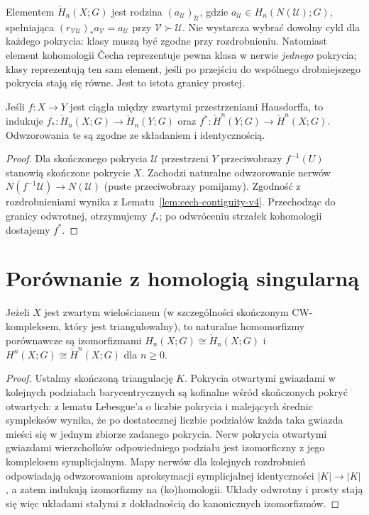 \begin{uwaga}
Elementem $\check H_n(X;G)$ jest rodzina
$(a_{\mathcal U})_{\mathcal U}$, gdzie
$a_{\mathcal U}\in H_n(N(\mathcal U);G)$, spełniająca
$(r_{\mathcal V\mathcal U})_*a_{\mathcal V}=a_{\mathcal U}$
przy $\mathcal V\succ\mathcal U$.
Nie wystarcza wybrać dowolny cykl dla każdego pokrycia:
klasy muszą być zgodne przy rozdrobnieniu.
Natomiast element kohomologii \v{C}echa reprezentuje pewna
klasa w nerwie \emph{jednego} pokrycia; klasy reprezentują
ten sam element, jeśli po przejściu do wspólnego drobniejszego
pokrycia stają się równe. Jest to istota granicy prostej.
\end{uwaga}

\begin{stwierdzenie}[Funktorialność]
Jeśli $f:X\to Y$ jest ciągła między zwartymi przestrzeniami
Hausdorffa, to indukuje
$f_*:\check H_n(X;G)\to\check H_n(Y;G)$
oraz $f^*:\check H^n(Y;G)\to\check H^n(X;G)$.
Odwzorowania te są zgodne ze składaniem i identycznością.
\end{stwierdzenie}
\begin{proof}
Dla skończonego pokrycia $\mathcal U$ przestrzeni $Y$
przeciwobrazy $f^{-1}(U)$ stanowią skończone pokrycie $X$.
Zachodzi naturalne odwzorowanie nerwów
$N(f^{-1}\mathcal U)\to N(\mathcal U)$ (puste przeciwobrazy
pomijamy). Zgodność z rozdrobnieniami wynika z
Lematu~\ref{lem:cech-contiguity-v4}. Przechodząc do granicy
odwrotnej, otrzymujemy $f_*$; po odwróceniu strzałek
kohomologii dostajemy $f^*$.
\end{proof}

\section{Porównanie z homologią singularną}
\begin{stwierdzenie}
\label{prop:cech-poly-v4}
Jeżeli $X$ jest zwartym wielościanem (w szczególności
skończonym CW-kompleksem, który jest triangulowalny), to
naturalne homomorfizmy porównawcze są izomorfizmami
$H_n(X;G)\cong\check H_n(X;G)$ i
$H^n(X;G)\cong\check H^n(X;G)$ dla $n\ge0$.
\end{stwierdzenie}
\begin{proof}
Ustalmy skończoną triangulację $K$. Pokrycia otwartymi
gwiazdami w kolejnych podziałach barycentrycznych są
kofinalne wśród skończonych pokryć otwartych: z lematu
Lebesgue'a o liczbie pokrycia i malejących średnic sympleksów
wynika, że po dostatecznej liczbie podziałów każda taka
gwiazda mieści się w jednym zbiorze zadanego pokrycia.
Nerw pokrycia otwartymi gwiazdami wierzchołków odpowiedniego
podziału jest izomorficzny z jego kompleksem symplicjalnym.
Mapy nerwów dla kolejnych rozdrobnień odpowiadają
odwzorowaniom aproksymacji symplicjalnej identyczności $|K|\to|K|$,
a zatem indukują izomorfizmy na (ko)homologii.
Układy odwrotny i prosty stają się więc układami
stałymi z dokładnością do kanonicznych izomorfizmów.
\end{proof}

